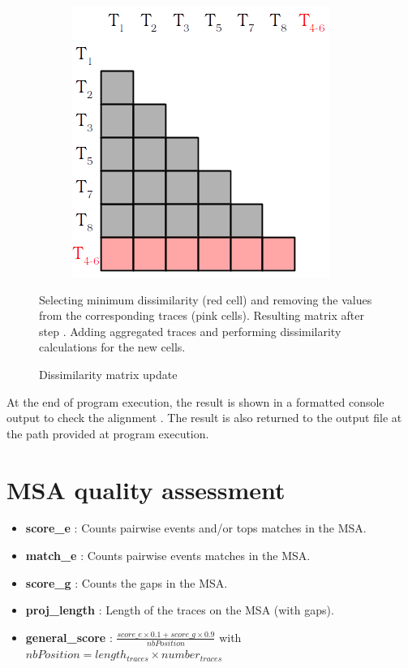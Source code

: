 \documentclass[12pt,a4paper]{article}
\begin{document}
\begin{figure}[H]
\begin{subfigure}[t]{0.33\linewidth}
		\includegraphics[width=0.7\linewidth]{img/matrix3.png}
		\caption{}
		\label{sub:matrix3}
	\end{subfigure}
	\caption{Dissimilarity matrix update}{
		\emph{\color{blue}{(a)}} Selecting minimum dissimilarity (red cell) and removing the values from the corresponding traces (pink cells).
		\emph{\color{blue}{(b)}} Resulting matrix after step \emph{\color{blue}{a}}.
		\emph{\color{blue}{(c)}} Adding aggregated traces and performing dissimilarity calculations for the new cells.
	}
	\label{fig:matrix}
\end{figure}

At the end of program execution, the result is shown in a formatted console output to check the alignment {}. The result is also returned to the output file at the path provided at program execution.




\section{MSA quality assessment}


\begin{itemize}
	\item \textbf{score\_e} : Counts pairwise events and/or tops matches in the MSA.
	\item \textbf{match\_e} : Counts pairwise events matches in the MSA.
	\item \textbf{score\_g} : Counts the gaps in the MSA.
	\item \textbf{proj\_length} : Length of the traces on the MSA (with gaps).
	\item \textbf{general\_score} : $\frac{score\_e \times 0.1 + score\_g \times 0.9}{nbPosition}$ with $nbPosition = length_{traces} \times number_{traces}$
\end{itemize}
\end{document}
